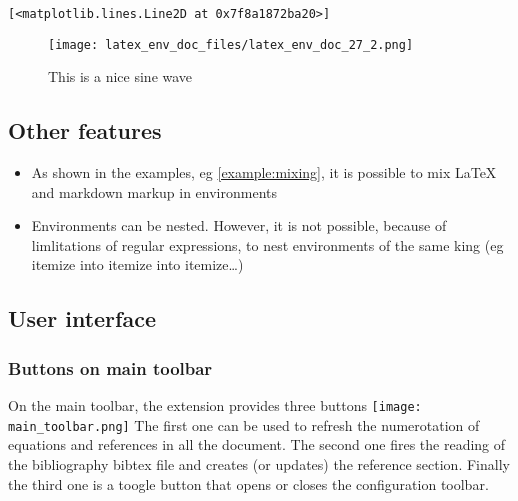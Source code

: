     

    
    
    
    \begin{verbatim}
[<matplotlib.lines.Line2D at 0x7f8a1872ba20>]
    \end{verbatim}

    

    
\begin{figure}[H]
\centering
\texttt{[image: latex\_env\_doc\_files/latex\_env\_doc\_27\_2.png]}
\caption{This is a nice sine wave}
\label{fig:mysin}
\end{figure}
    
    \subsection{Other features}\label{other-features}

    \begin{itemize}
\tightlist
\item
  As shown in the examples, eg \ref{example:mixing}, it is possible to
  mix LaTeX and markdown markup in environments\\
\item
  Environments can be nested. However, it is not possible, because of
  limlitations of regular expressions, to nest environments of the same
  king (eg itemize into itemize into itemize\ldots{})
\end{itemize}

    \subsection{User interface}\label{user-interface}

    \subsubsection{Buttons on main toolbar}\label{buttons-on-main-toolbar}

    On the main toolbar, the extension provides three buttons
\texttt{[image: main\_toolbar.png]} The first one can be used to refresh
the numerotation of equations and references in all the document. The
second one fires the reading of the bibliography bibtex file and creates
(or updates) the reference section. Finally the third one is a toogle
button that opens or closes the configuration toolbar.


